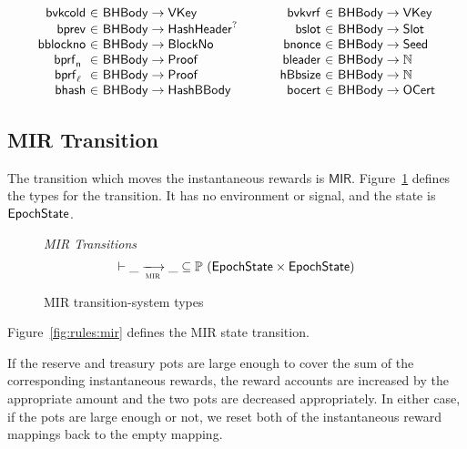 \begin{figure*}[htb]
\begin{equation*}
\begin{array}{r@{~\in~}l@{~~~~~~~~~~}r@{~\in~}lr}
      \fun{bvkcold} & \BHBody \to \VKey &
      \fun{bvkvrf} & \BHBody \to \VKey \\
      \fun{bprev} & \BHBody \to \HashHeader^? &
      \fun{bslot} & \BHBody \to \Slot \\
      \fun{bblockno} & \BHBody \to \BlockNo &
      \fun{bnonce} & \BHBody \to \Seed \\
      \fun{\bprfn{}} & \BHBody \to \Proof &
      \fun{bleader} & \BHBody \to \N \\
      \fun{\bprfl{}} & \BHBody \to \Proof &
      \fun{hBbsize} & \BHBody \to \N \\
      \fun{bhash} & \BHBody \to \HashBBody &
      \fun{bocert} & \BHBody \to \OCert \\
    \end{array}
  \end{equation*}
  \caption{Block Definitions}
  \label{fig:defs:blocks}
\end{figure*}

\clearpage

\subsection{MIR Transition}
\label{sec:mir-trans}

The transition which moves the instantaneous rewards is $\mathsf{MIR}$.
Figure~\ref{fig:ts-types:mir} defines the types for the transition.
It has no environment or signal, and the state is $\mathsf{EpochState}$.

\begin{figure}
  \emph{MIR Transitions}
  \begin{equation*}
    \vdash \var{\_} \trans{mir}{} \var{\_} \subseteq
    \powerset (\EpochState \times \EpochState)
  \end{equation*}
  \caption{MIR transition-system types}
  \label{fig:ts-types:mir}
\end{figure}

Figure~\ref{fig:rules:mir} defines the MIR state transition.

If the reserve and treasury pots are large enough to cover the sum
of the corresponding instantaneous rewards,
the reward accounts are increased by the appropriate amount
and the two pots are decreased appropriately.
In either case, if the pots are large enough or not,
we reset both of the instantaneous reward mappings back to the empty mapping.

